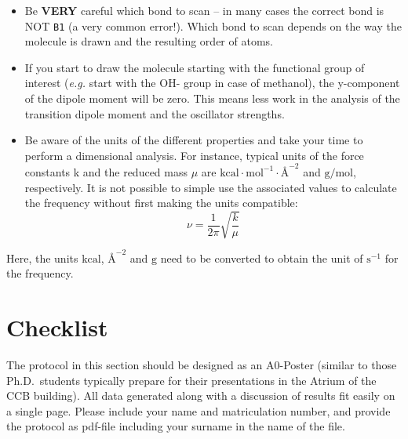 \documentclass[
  letterpaper,
]{article}
\providecommand{\tightlist}{%
  \setlength{\itemsep}{0pt}\setlength{\parskip}{0pt}}\usepackage{longtable,booktabs,array}
\begin{document}
\begin{tcolorbox}[enhanced jigsaw, toptitle=1mm, opacitybacktitle=0.6, colframe=quarto-callout-important-color-frame, toprule=.15mm, breakable, bottomrule=.15mm, left=2mm, title=\textcolor{quarto-callout-important-color}{\faExclamation}\hspace{0.5em}{Common errors/pitfalls in this exercise}, titlerule=0mm, leftrule=.75mm, bottomtitle=1mm, coltitle=black, arc=.35mm, rightrule=.15mm, opacityback=0, colback=white, colbacktitle=quarto-callout-important-color!10!white]

\begin{itemize}
\tightlist
\item
  Be \textbf{VERY} careful which bond to scan -- in many cases the
  correct bond is NOT \texttt{B1} (a very common error!). Which bond to
  scan depends on the way the molecule is drawn and the resulting order
  of atoms.
\item
  If you start to draw the molecule starting with the functional group
  of interest (\emph{e.g.} start with the OH- group in case of
  methanol), the y-component of the dipole moment will be zero. This
  means less work in the analysis of the transition dipole moment and
  the oscillator strengths.
\item
  Be aware of the units of the different properties and take your time
  to perform a dimensional analysis. For instance, typical units of the
  force constants k and the reduced mass \(\mu\) are
  \(\mathrm{kcal \cdot mol^{-1}\cdot Å^{-2}}\) and \(\mathrm{g/mol}\),
  respectively. It is not possible to simple use the associated values
  to calculate the frequency without first making the units compatible:
  \[
  \nu = \frac{1}{2\pi}\sqrt{\frac{k}{\mu}}
  \]
\end{itemize}

Here, the units \(\mathrm{kcal}\), \(\mathrm{Å^{-2}}\) and
\(\mathrm{g}\) need to be converted to obtain the unit of
\(\mathrm{s^{-1}}\) for the frequency.

\end{tcolorbox}

\hypertarget{checklist}{%
\section{Checklist}\label{checklist}}

The protocol in this section should be designed as an A0-Poster (similar
to those Ph.D.~students typically prepare for their presentations in the
Atrium of the CCB building). All data generated along with a discussion
of results fit easily on a single page. Please include your name and
matriculation number, and provide the protocol as pdf-file including
your surname in the name of the file.
\end{document}
